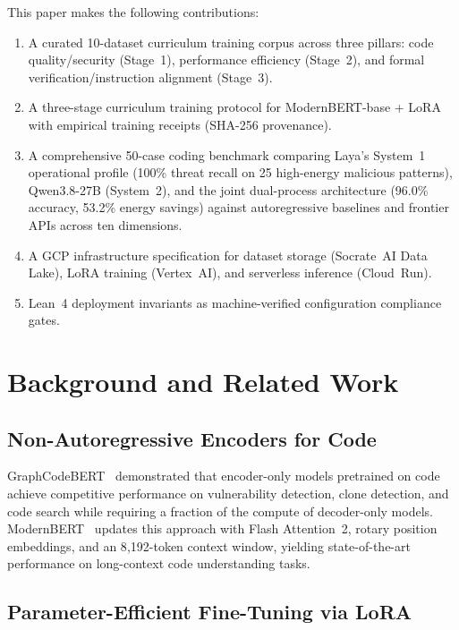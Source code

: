 \documentclass[conference]{IEEEtran}
\begin{document}
This paper makes the following contributions:
\begin{enumerate}
  \item A curated 10-dataset curriculum training corpus across three pillars:
        code quality/security (Stage~1), performance efficiency (Stage~2),
        and formal verification/instruction alignment (Stage~3).
  \item A three-stage curriculum training protocol for ModernBERT-base + LoRA
        with empirical training receipts (SHA-256 provenance).
  \item A comprehensive 50-case coding benchmark comparing Laya's System~1 operational profile
        (100\% threat recall on 25 high-energy malicious patterns), Qwen3.8-27B (System~2),
        and the joint dual-process architecture (96.0\% accuracy, 53.2\% energy savings)
        against autoregressive baselines and frontier APIs across ten dimensions.
  \item A GCP infrastructure specification for dataset storage (Socrate~AI Data Lake),
        LoRA training (Vertex~AI), and serverless inference (Cloud~Run).
  \item Lean~4 deployment invariants as machine-verified configuration compliance gates.
\end{enumerate}

\section{Background and Related Work}
\label{sec:background}

\subsection{Non-Autoregressive Encoders for Code}

GraphCodeBERT~\cite{guo2021graphcodebert} demonstrated that encoder-only models
pretrained on code achieve competitive performance on vulnerability detection, clone detection,
and code search while requiring a fraction of the compute of decoder-only models.
ModernBERT~\cite{warner2024modernbert} updates this approach with Flash Attention~2,
rotary position embeddings, and an 8{,}192-token context window, yielding state-of-the-art
performance on long-context code understanding tasks.

\subsection{Parameter-Efficient Fine-Tuning via LoRA}
\end{document}
